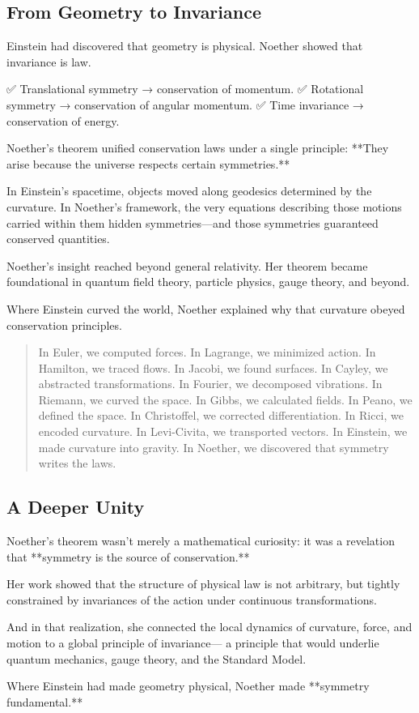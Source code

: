 \bigskip

\subsection*{From Geometry to Invariance}

Einstein had discovered that geometry is physical.  
Noether showed that invariance is law.

✅ Translational symmetry → conservation of momentum.  
✅ Rotational symmetry → conservation of angular momentum.  
✅ Time invariance → conservation of energy.

Noether’s theorem unified conservation laws under a single principle:  
**They arise because the universe respects certain symmetries.**

\bigskip

In Einstein’s spacetime, objects moved along geodesics determined by the curvature.  
In Noether’s framework, the very equations describing those motions carried within them hidden symmetries—and those symmetries guaranteed conserved quantities.

Noether’s insight reached beyond general relativity.  
Her theorem became foundational in quantum field theory, particle physics, gauge theory, and beyond.

Where Einstein curved the world,  
Noether explained why that curvature obeyed conservation principles.

\bigskip

\begin{quote}
In Euler, we computed forces.  
In Lagrange, we minimized action.  
In Hamilton, we traced flows.  
In Jacobi, we found surfaces.  
In Cayley, we abstracted transformations.  
In Fourier, we decomposed vibrations.  
In Riemann, we curved the space.  
In Gibbs, we calculated fields.  
In Peano, we defined the space.  
In Christoffel, we corrected differentiation.  
In Ricci, we encoded curvature.  
In Levi-Civita, we transported vectors.  
In Einstein, we made curvature into gravity.  
In Noether, we discovered that symmetry writes the laws.
\end{quote}

\subsection*{A Deeper Unity}

Noether’s theorem wasn’t merely a mathematical curiosity:  
it was a revelation that **symmetry is the source of conservation.**

Her work showed that the structure of physical law is not arbitrary,  
but tightly constrained by invariances of the action under continuous transformations.

And in that realization, she connected the local dynamics of curvature, force, and motion  
to a global principle of invariance—  
a principle that would underlie quantum mechanics, gauge theory, and the Standard Model.

Where Einstein had made geometry physical,  
Noether made **symmetry fundamental.**

